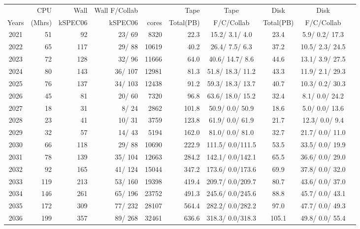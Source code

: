 \documentclass[12pt]{article}
\begin{document}
\begin{table}
\footnotesize
 \centering \begin{tabular}[h]{crrrrrcccc}
 & CPU &Wall&Wall F/Collab&\qquad  & Tape\qquad& Tape\qquad  & Disk\qquad  & Disk\qquad \\
Years&(Mhrs)&kSPEC06&kSPEC06&cores& Total(PB)&F/C/Collab & Total(PB) &F/C/Collab\\
\hline
2021&	  51&	  92&	  23/  69&	  8320&	     22.3&	  15.2/  3.1/  4.0&	     23.4&	   5.9/  0.2/ 17.3\\
2022&	  65&	 117&	  29/  88&	 10619&	     40.2&	  26.4/  7.5/  6.3&	     37.2&	  10.5/  2.3/ 24.5\\
2023&	  72&	 128&	  32/  96&	 11666&	     64.0&	  40.6/ 14.7/  8.6&	     44.6&	  13.1/  3.9/ 27.5\\
2024&	  80&	 143&	  36/ 107&	 12981&	     81.3&	  51.8/ 18.3/ 11.2&	     43.3&	  11.9/  2.1/ 29.3\\
2025&	  76&	 137&	  34/ 103&	 12438&	     91.2&	  59.3/ 18.3/ 13.7&	     40.7&	  10.3/  0.2/ 30.3\\
2026&	  45&	  81&	  20/  60&	  7320&	     96.8&	  63.6/ 18.0/ 15.2&	     32.4&	   8.1/  0.0/ 24.2\\
2027&	  18&	  31&	   8/  24&	  2862&	    101.8&	  50.9/  0.0/ 50.9&	     18.6&	   5.0/  0.0/ 13.6\\
2028&	  23&	  41&	  10/  31&	  3759&	    123.8&	  61.9/  0.0/ 61.9&	     21.7&	  12.3/  0.0/  9.4\\
2029&	  32&	  57&	  14/  43&	  5194&	    162.0&	  81.0/  0.0/ 81.0&	     32.7&	  21.7/  0.0/ 11.0\\
2030&	  66&	 118&	  29/  88&	 10690&	    222.9&	 111.5/  0.0/111.5&	     53.5&	  33.5/  0.0/ 19.9\\
2031&	  78&	 139&	  35/ 104&	 12663&	    284.2&	 142.1/  0.0/142.1&	     65.5&	  36.6/  0.0/ 29.0\\
2032&	  92&	 165&	  41/ 124&	 15044&	    347.2&	 173.6/  0.0/173.6&	     69.9&	  37.8/  0.0/ 32.0\\
2033&	 119&	 213&	  53/ 160&	 19398&	    419.4&	 209.7/  0.0/209.7&	     80.7&	  43.6/  0.0/ 37.0\\
2034&	 146&	 261&	  65/ 196&	 23752&	    491.3&	 245.6/  0.0/245.6&	     88.8&	  45.7/  0.0/ 43.1\\
2035&	 172&	 309&	  77/ 232&	 28107&	    564.4&	 282.2/  0.0/282.2&	     97.0&	  47.7/  0.0/ 49.3\\
2036&	 199&	 357&	  89/ 268&	 32461&	    636.6&	 318.3/  0.0/318.3&	    105.1&	  49.8/  0.0/ 55.4\\

\end{tabular}
\end{table}
\end{document}
